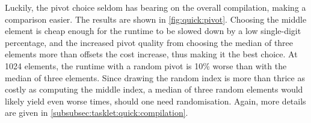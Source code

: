 Luckily, the pivot choice seldom has bearing on the overall compilation, making a comparison easier.
The results are shown in \cref{fig:quick:pivot}.
Choosing the middle element is cheap enough for the runtime to be slowed down by a low single-digit percentage, and the increased pivot quality from choosing the median of three elements more than offsets the cost increase, thus making it the best choice.
At 1024 elements, the runtime with a random pivot is 10\% worse than with the median of three elements.
Since drawing the random index is more than thrice as costly as computing the middle index, a median of three random elements would likely yield even worse times, should one need randomisation.
Again, more details are given in \cref{subsubsec:tasklet:quick:compilation}.




